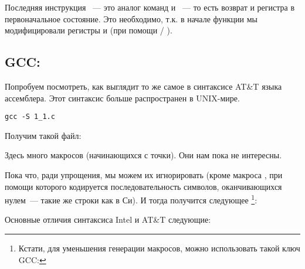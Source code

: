 Последняя инструкция \LEAVE~--- это аналог команд  и ~--- то есть возврат  и регистра \EBP в первоначальное состояние.
Это необходимо, т.к. в начале функции мы модифицировали регистры \ESP и \EBP (при помощи  / ).

\subsection{GCC: \ATTSyntax}
\label{ATT_syntax}

Попробуем посмотреть, как выглядит то же самое в синтаксисе AT\&T языка ассемблера.
Этот синтаксис больше распространен в UNIX-мире.

\begin{lstlisting}[caption=компилируем в GCC 4.7.3]
gcc -S 1_1.c
\end{lstlisting}

Получим такой файл:



Здесь много макросов (начинающихся с точки). Они нам пока не интересны.

Пока что, ради упрощения, мы можем 
их игнорировать (кроме макроса , при помощи которого кодируется последовательность символов, 
оканчивающихся нулем~--- такие же строки как в Си). И тогда получится следующее
\footnote{Кстати, для уменьшения генерации  макросов, можно использовать такой ключ GCC: }:



\index{\ATTSyntax}
\index{\IntelSyntax}
Основные отличия синтаксиса Intel и AT\&T следующие:

